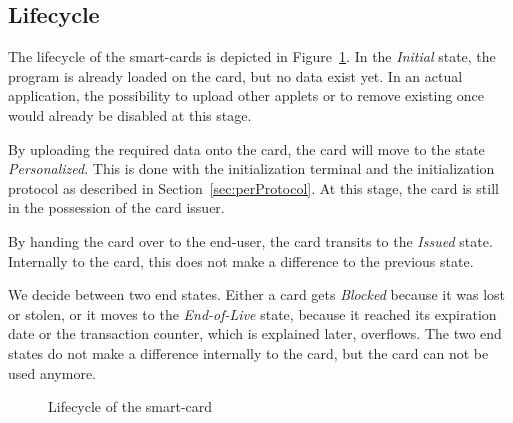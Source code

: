 \subsection{Lifecycle}
The lifecycle of the smart-cards is depicted in Figure~\ref{fig:lifecycle}.
In the \emph{Initial} state, the program is already loaded on the card, but no data exist yet.
In an actual application, the possibility to upload other applets or to remove existing once would already be disabled at this stage.

By uploading the required data onto the card, the card will move to the state \emph{Personalized}.
This is done with the initialization terminal and the initialization protocol as described in Section~\ref{sec:perProtocol}.
At this stage, the card is still in the possession of the card issuer.

By handing the card over to the end-user, the card transits to the \emph{Issued} state.
Internally to the card, this does not make a difference to the previous state.

We decide between two end states.
Either a card gets \emph{Blocked} because it was lost or stolen, or it moves to the \emph{End-of-Live} state, because it reached its expiration date or the transaction counter, which is explained later, overflows.
The two end states do not make a difference internally to the card, but the card can not be used anymore.

\begin{figure}
    \centering
    
    \caption{Lifecycle of the smart-card}
    \label{fig:lifecycle}
\end{figure}


